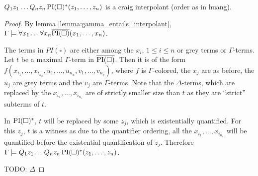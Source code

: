 \begin{thm}
	$Q_1 z_1 \ldots Q_n z_n \operatorname{PI}(\square)^*(z_1, \ldots, z_n)$ is a craig interpolant (order as in huang).
\end{thm}
\begin{proof}
	By lemma \ref{lemma:gamma_entails_interpolant}, $\Gamma \models \forall x_1 \ldots \forall x_n \overline{\operatorname{PI}(\square)}(x_1, \ldots, x_n)$.

	The terms in $\overline{PI(\square)}$ are either among the $x_i$, $1 \leq i \leq n$ or grey terms or $\Gamma$-terms.
	Let $t$ be a maximal $\Gamma$-term in $\overline{\operatorname{PI}(\square)}$.
	Then it is of the form $f(x_{i_1}, \ldots, x_{i_{n_x}}, u_1, \ldots, u_{n_u}, v_1, \ldots, v_{n_v})$, where $f$ is $\Gamma$-colored, the $x_j$ are as before, the $u_j$ are grey terms and the $v_j$ are $\Gamma$-terms.
	Note that the $\Delta$-terms, which are replaced by the $x_{i_1}, \ldots, x_{i_{n_x}}$ are of strictly smaller size than $t$ as they are ``strict'' subterms of $t$.

	In $\operatorname{PI}(\square)^*$, $t$ will be replaced by some $z_j$, which is existentially quantified.
	For this $z_j$, $t$ is a witness as due to the quantifier ordering, all the $x_{i_1}, \ldots, x_{i_{n_x}}$ will be quantified before the existential quantification of $z_j$.
	Therefore $\Gamma \models Q_1 z_1 \ldots Q_n z_n \operatorname{PI}(\square)^*(z_1, \ldots, z_n)$.

	TODO: $\Delta$
\end{proof}



